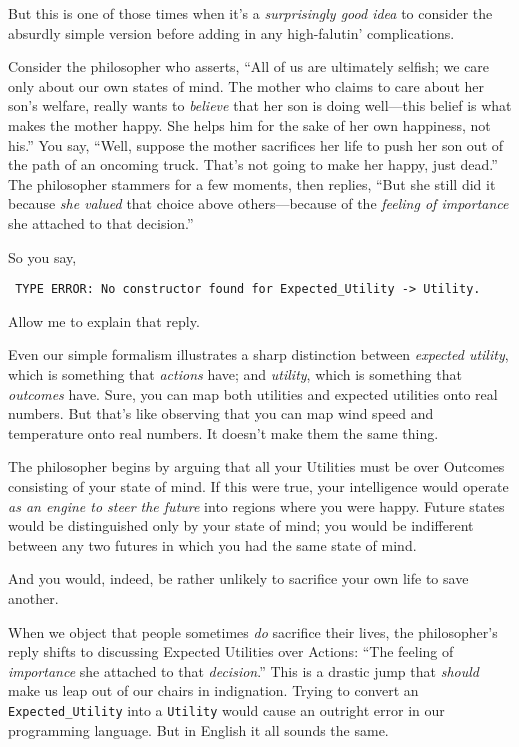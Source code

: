 {
 But this is one of those times when it's a
\textit{surprisingly good idea} to consider the absurdly simple version
before adding in any high-falutin' complications.}

{
 Consider the philosopher who asserts, ``All of us
are ultimately selfish; we care only about our own states of mind. The
mother who claims to care about her son's welfare,
really wants to \textit{believe} that her son is doing well---this
belief is what makes the mother happy. She helps him for the sake of
her own happiness, not his.'' You say,
``Well, suppose the mother sacrifices her life to push
her son out of the path of an oncoming truck. That's
not going to make her happy, just dead.'' The
philosopher stammers for a few moments, then replies,
``But she still did it because \textit{she valued}
that choice above others---because of the \textit{feeling of
importance} she attached to that decision.''}

{
 So you say,}

\texttt{
 TYPE ERROR: No constructor found for Expected\_Utility
-{\textgreater} Utility.}

{
 Allow me to explain that reply.}

{
 Even our simple formalism illustrates a sharp distinction between
\textit{expected utility}, which is something that \textit{actions}
have; and \textit{utility}, which is something that \textit{outcomes}
have. Sure, you can map both utilities and expected utilities onto real
numbers. But that's like observing that you can map
wind speed and temperature onto real numbers. It
doesn't make them the same thing.}

{
 The philosopher begins by arguing that all your Utilities must be
over Outcomes consisting of your state of mind. If this were true, your
intelligence would operate \textit{as an engine to steer the future}
into regions where you were happy. Future states would be distinguished
only by your state of mind; you would be indifferent between any two
futures in which you had the same state of mind.}

{
 And you would, indeed, be rather unlikely to sacrifice your own
life to save another.}

{
 When we object that people sometimes \textit{do} sacrifice their
lives, the philosopher's reply shifts to discussing
Expected Utilities over Actions: ``The feeling of
\textit{importance} she attached to that
\textit{decision}.'' This is a drastic jump that
\textit{should} make us leap out of our chairs in indignation. Trying
to convert an \texttt{Expected\_Utility} into a \texttt{Utility} would cause an outright
error in our programming language. But in English it all sounds the
same.}

